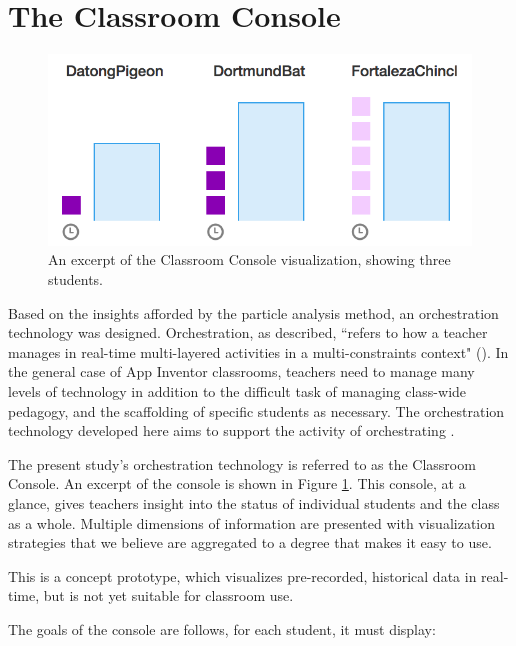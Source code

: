 \section{The Classroom Console}
\label{sec:classroom-console}

\begin{figure}
  \centering
      \includegraphics{images/ch4-console-demo}
  \caption[Excerpt of the Classroom Console]{An excerpt of the Classroom Console visualization, showing three students.}
  \label{fig:console-demo}
\end{figure}


Based on the insights afforded by the particle analysis method, an orchestration technology was designed. Orchestration, as \citeauthor{dillenbourg2012design} described, ``refers to how a teacher manages in real-time multi-layered activities in a multi-constraints context" (\citeyear{dillenbourg2012design}). In the general case of App Inventor classrooms, teachers need to manage many levels of technology in addition to the difficult task of managing class-wide pedagogy, and the scaffolding of specific students as necessary. The orchestration technology developed here aims to support the activity of orchestrating \citep{tchounikine2013clarifying}.

The present study's orchestration technology is referred to as the Classroom Console. An excerpt of the console is shown in Figure \ref{fig:console-demo}. This console, at a glance, gives teachers insight into the status of individual students and the class as a whole. Multiple dimensions of information are presented with visualization strategies that we believe are aggregated to a degree that makes it easy to use. 

This is a concept prototype, which visualizes pre-recorded, historical data in real-time, but is not yet suitable for classroom use.

The goals of the console are follows, for each student, it must display:

